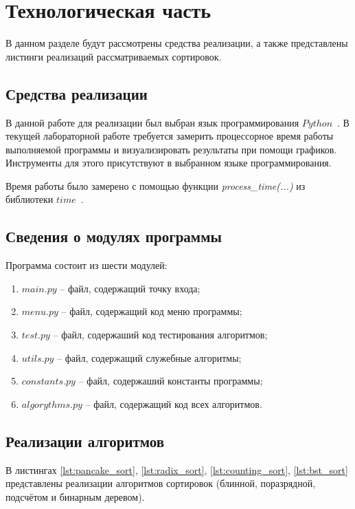 \chapter{Технологическая часть}

В данном разделе будут рассмотрены средства реализации, а также представлены листинги реализаций рассматриваемых сортировок.

\section{Средства реализации}
В данной работе для реализации был выбран язык программирования $Python$~\cite{python-lang}. В текущей лабораторной работе требуется замерить процессорное время работы выполняемой программы
и визуализировать результаты при помощи графиков. Инструменты для этого присутствуют в выбранном языке программирования.

Время работы было замерено с помощью функции \textit{process\_time(...)} из библиотеки $time$~\cite{python-lang-time}.

\section{Сведения о модулях программы}
Программа состоит из шести модулей:
\begin{enumerate}[label=\arabic*)]
	\item $main.py$ -- файл, содержащий точку входа;
	\item $menu.py$ -- файл, содержащий код меню программы;
	\item $test.py$ -- файл, содержаший код тестирования алгоритмов;
	\item $utils.py$ -- файл, содержащий служебные алгоритмы;
	\item $constants.py$ -- файл, содержаший константы программы;
	\item $algorythms.py$ -- файл, содержащий код всех алгоритмов. \newline
\end{enumerate}


\section{Реализации алгоритмов}

В листингах \ref{lst:pancake_sort}, \ref{lst:radix_sort}, \ref{lst:counting_sort}, \ref{lst:bst_sort} представлены реализации алгоритмов сортировок (блинной, поразрядной, подсчётом и бинарным деревом). \clearpage

